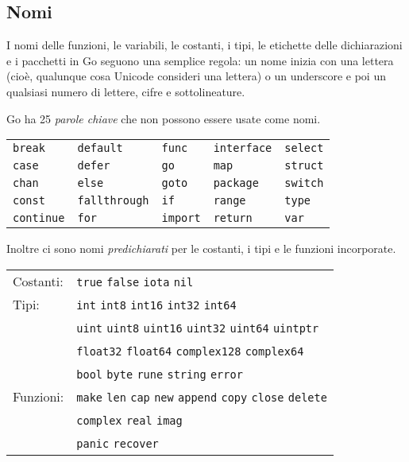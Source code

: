 \documentclass[../../thesis.tex]{subfiles}
\begin{document}
    \subsection{Nomi}\label{subsec:nomi}
    I nomi delle funzioni, le variabili, le costanti, i tipi, le etichette delle dichiarazioni e i pacchetti in Go seguono una semplice regola: un nome inizia con una lettera (cioè, qualunque cosa Unicode consideri una lettera) o un underscore e poi un qualsiasi numero di lettere, cifre e sottolineature.
    \hfill \vspace{12pt}

    Go ha 25 \textit{parole chiave} che non possono essere usate come nomi.
    \hfill \vspace{12pt}

    \begin{tabular}{ l l l l l }
        \verb"break"    & \verb"default"     & \verb"func"   & \verb"interface" & \verb"select" \\
        \verb"case"     & \verb"defer"       & \verb"go"     & \verb"map"       & \verb"struct" \\
        \verb"chan"     & \verb"else"        & \verb"goto"   & \verb"package"   & \verb"switch" \\
        \verb"const"    & \verb"fallthrough" & \verb"if"     & \verb"range"     & \verb"type"   \\
        \verb"continue" & \verb"for"         & \verb"import" & \verb"return"    & \verb"var"
    \end{tabular}

    Inoltre ci sono nomi \textit{predichiarati} per le costanti, i tipi e le funzioni incorporate.
    \hfill \vspace{12pt}

    \begin{tabular}{ l l }
        Costanti: & \verb"true" \verb"false" \verb"iota" \verb"nil"                                                   \\
        Tipi:     & \verb"int" \verb"int8" \verb"int16" \verb"int32" \verb"int64"                                     \\
        & \verb"uint" \verb"uint8" \verb"uint16" \verb"uint32" \verb"uint64" \verb"uintptr"                 \\
        & \verb"float32" \verb"float64" \verb"complex128" \verb"complex64"                                  \\
        & \verb"bool" \verb"byte" \verb"rune" \verb"string" \verb"error"                                    \\
        Funzioni: & \verb"make" \verb"len" \verb"cap" \verb"new" \verb"append" \verb"copy" \verb"close" \verb"delete" \\
        & \verb"complex" \verb"real" \verb"imag"                                                            \\
        & \verb"panic" \verb"recover"
    \end{tabular}
    \hfill \vspace{12pt}
\end{document}
